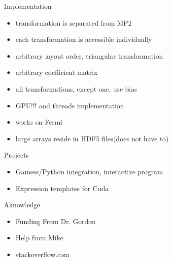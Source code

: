 \documentclass{beamer}
\begin{document}
\begin{frame}{Implementation}
  \begin{itemize}
  \item transformation is separated from MP2
  \item each transformation is accessible individually
  \item arbitrary layout order, triangular transformation
  \item arbitrary coefficient matrix
  \item all transformations, except one, use blas
  \item GPU!!! and threads implementation
  \item works on Fermi
  \item large arrays reside in HDF5 files(does not have to)
  \end{itemize}
\end{frame}

\begin{frame}{Projects}
  \begin{itemize}
  \item  Gamess/Python integration, interactive program
  \item Expression templates for Cuda
  \end{itemize}
\end{frame}


\begin{frame}{Aknowledge}
  \begin{itemize}
  \item Funding From Dr. Gordon
  \item Help from Mike
  \item stackoverflow.com
  \end{itemize}
\end{frame}

\tiny {

  \lstset{language=C++}
  

  \lstset{language=C++}
  

}
\end{document}
